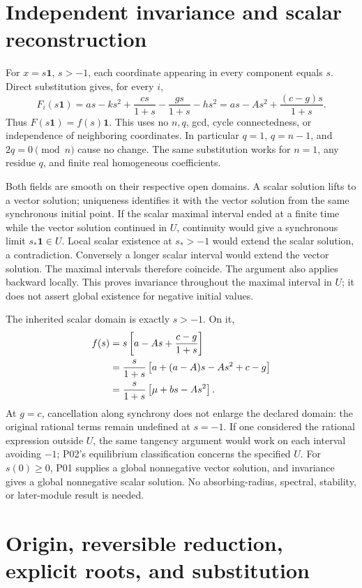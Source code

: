 \documentclass[11pt]{article}
\newcommand{\one}{\mathbf 1}
\begin{document}
\section{Independent invariance and scalar reconstruction}

For \(x=s\one\), \(s>-1\), each coordinate appearing in every component
equals \(s\). Direct substitution gives, for every \(i\),
\[
F_i(s\one)=as-ks^2+\frac{cs}{1+s}
-\frac{gs}{1+s}-hs^2
=as-As^2+\frac{(c-g)s}{1+s}.
\]
Thus \(F(s\one)=f(s)\one\). This uses no \(n,q\), gcd, cycle
connectedness, or independence of neighboring coordinates. In particular
\(q=1\), \(q=n-1\), and \(2q=0\pmod n\) cause no change.
The same substitution works for \(n=1\), any residue \(q\), and finite
real homogeneous coefficients.

Both fields are smooth on their respective open domains. A scalar
solution lifts to a vector solution; uniqueness identifies it with the
vector solution from the same synchronous initial point. If the scalar
maximal interval ended at a finite time while the vector solution
continued in \(U\), continuity would give a synchronous limit
\(s_*\one\in U\). Local scalar existence at \(s_*>-1\) would extend
the scalar solution, a contradiction. Conversely a longer scalar
interval would extend the vector solution. The maximal intervals
therefore coincide. The argument also applies backward locally.
This proves invariance throughout the maximal interval in \(U\);
it does not assert global existence for negative initial values.

The inherited scalar domain is exactly \(s>-1\). On it,
\begin{align}
f(s)&=s\left[a-As+\frac{c-g}{1+s}\right]\notag\\
&=\frac{s}{1+s}\left[a+(a-A)s-As^2+c-g\right]\notag\\
&=\frac{s}{1+s}\left[\mu+bs-As^2\right].
\label{A02:scalar}
\end{align}
At \(g=c\), cancellation along synchrony does not enlarge the declared
domain: the original rational terms remain undefined at \(s=-1\).
If one considered the rational expression outside \(U\), the same
tangency argument would work on each interval avoiding \(-1\);
P02's equilibrium classification concerns the specified \(U\).
For \(s(0)\ge0\), P01 supplies a global nonnegative vector solution,
and invariance gives a global nonnegative scalar solution. No
absorbing-radius, spectral, stability, or later-module result is needed.

\section{Origin, reversible reduction, explicit roots, and substitution}
\end{document}
